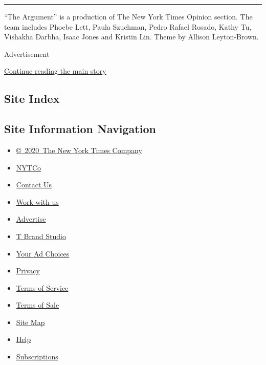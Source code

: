 \begin{center}\rule{0.5\linewidth}{\linethickness}\end{center}

``The Argument'' is a production of The New York Times Opinion section.
The team includes Phoebe Lett, Paula Szuchman, Pedro Rafael Rosado,
Kathy Tu, Vishakha Darbha, Isaac Jones and Kristin Lin. Theme by Allison
Leyton-Brown.

Advertisement

\protect\hyperlink{after-bottom}{Continue reading the main story}

\hypertarget{site-index}{%
\subsection{Site Index}\label{site-index}}

\hypertarget{site-information-navigation}{%
\subsection{Site Information
Navigation}\label{site-information-navigation}}

\begin{itemize}
\tightlist
\item
  \href{https://help.nytimes3xbfgragh.onion/hc/en-us/articles/115014792127-Copyright-notice}{©~2020~The
  New York Times Company}
\end{itemize}

\begin{itemize}
\tightlist
\item
  \href{https://www.nytco.com/}{NYTCo}
\item
  \href{https://help.nytimes3xbfgragh.onion/hc/en-us/articles/115015385887-Contact-Us}{Contact
  Us}
\item
  \href{https://www.nytco.com/careers/}{Work with us}
\item
  \href{https://nytmediakit.com/}{Advertise}
\item
  \href{http://www.tbrandstudio.com/}{T Brand Studio}
\item
  \href{https://www.nytimes3xbfgragh.onion/privacy/cookie-policy\#how-do-i-manage-trackers}{Your
  Ad Choices}
\item
  \href{https://www.nytimes3xbfgragh.onion/privacy}{Privacy}
\item
  \href{https://help.nytimes3xbfgragh.onion/hc/en-us/articles/115014893428-Terms-of-service}{Terms
  of Service}
\item
  \href{https://help.nytimes3xbfgragh.onion/hc/en-us/articles/115014893968-Terms-of-sale}{Terms
  of Sale}
\item
  \href{https://spiderbites.nytimes3xbfgragh.onion}{Site Map}
\item
  \href{https://help.nytimes3xbfgragh.onion/hc/en-us}{Help}
\item
  \href{https://www.nytimes3xbfgragh.onion/subscription?campaignId=37WXW}{Subscriptions}
\end{itemize}
